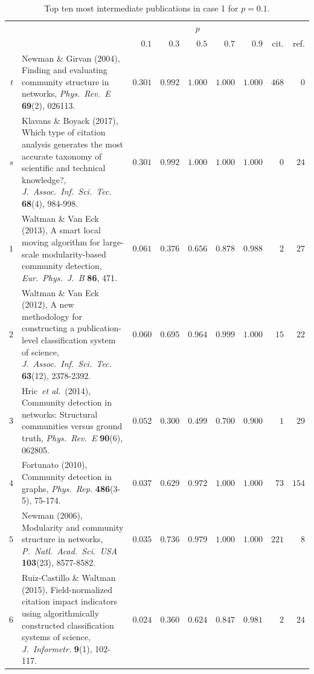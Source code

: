 \documentclass[9pt,twocolumn,twoside,lineno]{pnas-alt}
\theoremstyle{definition}
\renewcommand{\etal}{~\emph{et al.}\xspace}
\begin{document}
\begin{sansmath}\begin{table}[b!]%
  \caption{Top ten most intermediate publications in case 1 for $p = 0.1$.}
  \begin{tabular}{rp{9.75cm}rrrrrrr}
    & & \multicolumn{5}{c}{$p$} \\\cmidrule{3-7}
    & & $0.1$ & $0.3$ & $0.5$ & $0.7$ & $0.9$ & cit. & ref. \\\midrule
    $t$ & Newman \& Girvan (2004), Finding and evaluating community structure in networks, \textit{Phys.\ Rev.\ E} \textbf{69}(2), 026113. & $0.301$ & $0.992$ & $1.000$ & $1.000$ & $1.000$ & $468$ & $0$ \\
    $s$ & Klavans \& Boyack (2017), Which type of citation analysis generates the most accurate taxonomy of scientific and technical knowledge?, \textit{J.\ Assoc.\ Inf.\ Sci.\ Tec.} \textbf{68}(4), 984-998. & $0.301$ & $0.992$ & $1.000$ & $1.000$ & $1.000$ & $0$ & $24$ \\\midrule
    $1$ & Waltman \& Van Eck (2013), A smart local moving algorithm for large-scale modularity-based community detection, \textit{Eur.\ Phys.\ J.\ B} \textbf{86}, 471. & $0.061$ & $0.376$ & $0.656$ & $0.878$ & $0.988$ & $2$ & $27$ \\
    $2$ & Waltman \& Van Eck (2012), A new methodology for constructing a publication-level classification system of science, \textit{J.\ Assoc.\ Inf.\ Sci.\ Tec.} \textbf{63}(12), 2378-2392. & $0.060$ & $0.695$ & $0.964$ & $0.999$ & $1.000$ & $15$ & $22$ \\
    $3$ & Hric\etal~(2014), Community detection in networks: Structural communities versus ground truth, \textit{Phys.\ Rev.\ E} \textbf{90}(6), 062805. & $0.052$ & $0.300$ & $0.499$ & $0.700$ & $0.900$ & $1$ & $29$ \\
    $4$ & Fortunato (2010), Community detection in graphs, \textit{Phys.\ Rep.} \textbf{486}(3-5), 75-174. & $0.037$ & $0.629$ & $0.972$ & $1.000$ & $1.000$ & $73$ & $154$ \\
    $5$ & Newman (2006), Modularity and community structure in networks, \textit{P.\ Natl.\ Acad.\ Sci.\ USA} \textbf{103}(23), 8577-8582. & $0.035$ & $0.736$ & $0.979$ & $1.000$ & $1.000$ & $221$ & $8$ \\
    $6$ & Ruiz-Castillo \& Waltman (2015), Field-normalized citation impact indicators using algorithmically constructed classification systems of science, \textit{J.\ Informetr.} \textbf{9}(1), 102-117. & $0.024$ & $0.360$ & $0.624$ & $0.847$ & $0.981$ & $2$ & $24$ \\

\end{tabular}
\end{table}
\end{sansmath}
\end{document}
